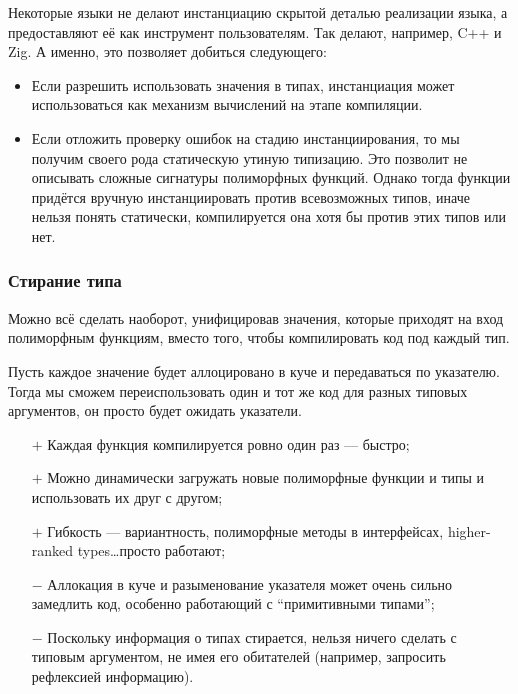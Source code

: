 \documentclass[12pt]{article}
\newcommand{\positive}{$+$} %
\newcommand{\negative}{{\color{red} $-$}} %
\begin{document}
    Некоторые языки не делают инстанциацию скрытой деталью реализации языка, а предоставляют её как инструмент пользователям.
    Так делают, например, C++ и Zig.
    А именно, это позволяет добиться следующего:
    \begin{itemize}
        \item Если разрешить использовать значения в типах, инстанциация может использоваться как механизм вычислений на этапе компиляции.
        \item Если отложить проверку ошибок на стадию инстанциирования, то мы получим своего рода статическую утиную типизацию.
        Это позволит не описывать сложные сигнатуры полиморфных функций.
        Однако тогда функции придётся вручную инстанциировать против всевозможных типов, иначе нельзя понять статически, компилируется она хотя бы против этих типов или нет.
    \end{itemize}


    \subsubsection{Стирание типа} \label{subsubsec:type-erasure}

    Можно всё сделать наоборот, унифицировав значения, которые приходят на вход полиморфным функциям, вместо того, чтобы компилировать код под каждый тип.

    Пусть каждое значение будет аллоцировано в куче и передаваться по указателю.
    Тогда мы сможем переиспользовать один и тот же код для разных типовых аргументов, он просто будет ожидать указатели.

    \begin{itemize}
        \item[\positive] Каждая функция компилируется ровно один раз --- быстро;
        \item[\positive] Можно динамически загружать новые полиморфные функции и типы и использовать их друг с другом;
        \item[\positive] Гибкость --- вариантность, полиморфные методы в интерфейсах, higher-ranked types\ldots просто работают;
        \item[\negative] Аллокация в куче и разыменование указателя может очень сильно замедлить код, особенно работающий с ``примитивными типами'';
        \item[\negative] Поскольку информация о типах стирается, нельзя ничего сделать с типовым аргументом, не имея его обитателей (например, запросить рефлексией информацию).
    \end{itemize}
\end{document}
